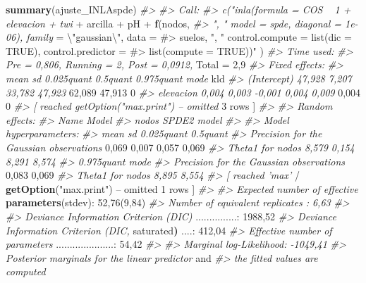 \documentclass[11pt,b5paper,]{krantz}
\newenvironment{Shaded}{}{}
\newcommand{\CharTok}[1]{\textcolor[rgb]{0.25,0.44,0.63}{#1}}
\newcommand{\CommentTok}[1]{\textcolor[rgb]{0.38,0.63,0.69}{\textit{#1}}}
\newcommand{\DecValTok}[1]{\textcolor[rgb]{0.25,0.63,0.44}{#1}}
\newcommand{\ErrorTok}[1]{\textcolor[rgb]{1.00,0.00,0.00}{\textbf{#1}}}
\newcommand{\KeywordTok}[1]{\textcolor[rgb]{0.00,0.44,0.13}{\textbf{#1}}}
\newcommand{\NormalTok}[1]{#1}
\newcommand{\OperatorTok}[1]{\textcolor[rgb]{0.40,0.40,0.40}{#1}}
\newcommand{\StringTok}[1]{\textcolor[rgb]{0.25,0.44,0.63}{#1}}
\begin{document}
\begin{Shaded}
\begin{Highlighting}[]
\KeywordTok{summary}\NormalTok{(ajuste_INLAspde)}
\CommentTok{#>}
\CommentTok{#> Call:}
\CommentTok{#> c("inla(formula = COS ~ 1 + elevacion + twi}
\OperatorTok{+}\StringTok{ }\NormalTok{arcilla }\OperatorTok{+}\StringTok{ }\NormalTok{pH }\OperatorTok{+}\StringTok{ }\KeywordTok{f}\NormalTok{(nodos,}
\CommentTok{#> ", " model = spde, diagonal = 1e-06), family}
\NormalTok{=}\StringTok{ }\NormalTok{\textbackslash{}}\StringTok{"gaussian}\CharTok{\textbackslash{}"}\StringTok{, data =}
\StringTok{#> suelos, "}\NormalTok{, }\StringTok{" control.compute = list(dic =}
\StringTok{TRUE), control.predictor =}
\StringTok{#> list(compute = TRUE))"}\NormalTok{ )}
\CommentTok{#> Time used:}
\CommentTok{#> Pre = 0,806, Running = 2, Post = 0,0912,}
\NormalTok{Total =}\StringTok{ }\DecValTok{2}\NormalTok{,}\DecValTok{9}
\CommentTok{#> Fixed effects:}
\CommentTok{#> mean sd 0.025quant 0.5quant 0.975quant mode}
\NormalTok{kld}
\CommentTok{#> (Intercept) 47,928 7,207 33,782 47,923}
\DecValTok{62}\NormalTok{,}\DecValTok{089} \DecValTok{47}\NormalTok{,}\DecValTok{913} \DecValTok{0}
\CommentTok{#> elevacion 0,004 0,003 -0,001 0,004 0,009}
\DecValTok{0}\NormalTok{,}\DecValTok{004} \DecValTok{0}
\CommentTok{#> [ reached getOption("max.print") -- omitted}
\DecValTok{3}\NormalTok{ rows ]}
\CommentTok{#>}
\CommentTok{#> Random effects:}
\CommentTok{#> Name Model}
\CommentTok{#> nodos SPDE2 model}
\CommentTok{#>}
\CommentTok{#> Model hyperparameters:}
\CommentTok{#> mean sd 0.025quant 0.5quant}
\CommentTok{#> Precision for the Gaussian observations}
\DecValTok{0}\NormalTok{,}\DecValTok{069} \DecValTok{0}\NormalTok{,}\DecValTok{007} \DecValTok{0}\NormalTok{,}\DecValTok{057} \DecValTok{0}\NormalTok{,}\DecValTok{069}
\CommentTok{#> Theta1 for nodos 8,579 0,154 8,291 8,574}
\CommentTok{#> 0.975quant mode}
\CommentTok{#> Precision for the Gaussian observations}
\DecValTok{0}\NormalTok{,}\DecValTok{083} \DecValTok{0}\NormalTok{,}\DecValTok{069}
\CommentTok{#> Theta1 for nodos 8,895 8,554}
\CommentTok{#> [ reached 'max'}
    \OperatorTok{/}\StringTok{ }\KeywordTok{getOption}\NormalTok{(}\StringTok{"max.print"}\NormalTok{) }\OperatorTok{--}
\NormalTok{omitted }\DecValTok{1}\NormalTok{ rows ]}
\CommentTok{#>}
\CommentTok{#> Expected number of effective}
\KeywordTok{parameters}\NormalTok{(stdev)}\OperatorTok{:}\StringTok{ }\DecValTok{52}\NormalTok{,}\DecValTok{76}\NormalTok{(}\DecValTok{9}\NormalTok{,}\DecValTok{84}\NormalTok{)}
\CommentTok{#> Number of equivalent replicates : 6,63}
\CommentTok{#>}
\CommentTok{#> Deviance Information Criterion (DIC)}
\NormalTok{...............}\OperatorTok{:}\StringTok{ }\DecValTok{1988}\NormalTok{,}\DecValTok{52}
\CommentTok{#> Deviance Information Criterion (DIC,}
\NormalTok{saturated}\ErrorTok{)}\NormalTok{ ....}\OperatorTok{:}\StringTok{ }\DecValTok{412}\NormalTok{,}\DecValTok{04}
\CommentTok{#> Effective number of parameters}
\NormalTok{.....................}\OperatorTok{:}\StringTok{ }\DecValTok{54}\NormalTok{,}\DecValTok{42}
\CommentTok{#>}
\CommentTok{#> Marginal log-Likelihood: -1049,41}
\CommentTok{#> Posterior marginals for the linear predictor}
\NormalTok{and}
\CommentTok{#> the fitted values are computed}
\end{Highlighting}
\end{Shaded}
\end{document}
